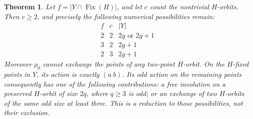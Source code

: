 \documentclass[11pt,a4paper]{article}
\newtheorem{theorem}[lemma]{Theorem}
\begin{document}
\begin{theorem}\label{budget}
Let $f=|Y\cap\operatorname{Fix}(H)|$, and let $c$ count
the nontrivial $H$-orbits. Then $c\ge2$, and precisely the
following numerical possibilities remain:
\[
\begin{array}{c|c|c}
f&c&|Y|\\\hline
2&2&2g\text{ or }2g+1\\
3&2&2g+1\\
2&3&2g+1
\end{array}                                                     \tag{1}
\]
Moreover $\rho_0$ cannot exchange the points of any two-point
$H$-orbit. On the $H$-fixed points in $Y$, its action is exactly
$(a\ b)$. Its odd action on the remaining points consequently
has one of the following contributions: a free involution on a
preserved $H$-orbit of size $2q$, where $q\ge3$ is odd; or an
exchange of two $H$-orbits of the same odd size at least three.
This is a reduction to those possibilities, not their exclusion.
\end{theorem}
\end{document}
